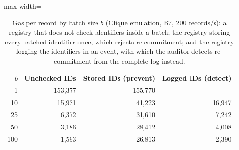 \begin{table}[t]
\centering
\scriptsize
\caption{Gas per record by batch size $b$ (Clique emulation, B7, 200 records/s): a registry that does not check identifiers inside a batch; the registry storing every batched identifier once, which rejects re-commitment; and the registry logging the identifiers in an event, with which the auditor detects re-commitment from the complete log instead.}
\label{tab:gas}
\begin{adjustbox}{max width=\linewidth}
\begin{tabular}{rrrr}
\toprule
$b$ & Unchecked IDs & Stored IDs (prevent) & Logged IDs (detect) \\
\midrule
1 & 153,377 & 155,770 & -- \\
10 & 15,931 & 41,223 & 16,947 \\
25 & 6,372 & 31,610 & 7,242 \\
50 & 3,186 & 28,412 & 4,008 \\
100 & 1,593 & 26,813 & 2,390 \\
\bottomrule
\end{tabular}\end{adjustbox}
\end{table}
